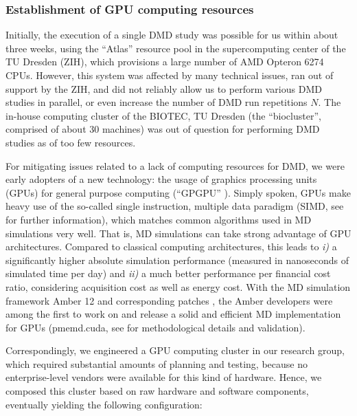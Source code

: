 \subsubsection{Establishment of GPU computing resources}

Initially, the execution of a single DMD study was possible for us within about
three weeks, using the \enquote{Atlas} resource pool in the supercomputing
center of the TU Dresden (ZIH), which provisions a large number of AMD Opteron
6274 CPUs. However, this system was affected by many technical issues, ran out
of support by the ZIH, and did not reliably allow us to perform various DMD
studies in parallel, or even increase the number of DMD run repetitions $N$. The
in-house computing cluster of the BIOTEC, TU Dresden (the
\enquote{biocluster}, comprised of about 30 machines) was out of question for
performing DMD studies as of too few resources.

For mitigating issues related to a lack of computing resources for DMD, we were
early adopters of a new technology: the usage of graphics processing units
(GPUs) for general purpose computing (\enquote{GPGPU} \cite{wikipedia_gpgpu}).
Simply spoken, GPUs make heavy use of the so-called single instruction, multiple
data paradigm (SIMD, see \cite{kirk2012programming_gpus} for further
information), which matches common algorithms used in MD simulations very well.
That is, MD simulations can take strong advantage of GPU architectures. Compared
to classical computing architectures, this leads to \textit{i)} a significantly
higher absolute simulation performance (measured in nanoseconds of simulated
time per day) and \textit{ii)} a much better performance per financial cost
ratio, considering acquisition cost as well as energy cost. With the MD
simulation framework Amber 12 \cite{case_amber_12} and corresponding patches
\cite{amber_12_patches}, the Amber developers were among the first to work on
and release a solid and efficient MD implementation for GPUs (pmemd.cuda, see
\cite{amber_gpu_2012,amber_gpu_pme_2013} for methodological details and
validation).

Correspondingly, we engineered a GPU computing cluster in our research group,
which required substantial amounts of planning and testing, because no
enterprise-level vendors were available for this kind of hardware. Hence, we
composed this cluster based on raw hardware and software components, eventually
yielding the following configuration:

